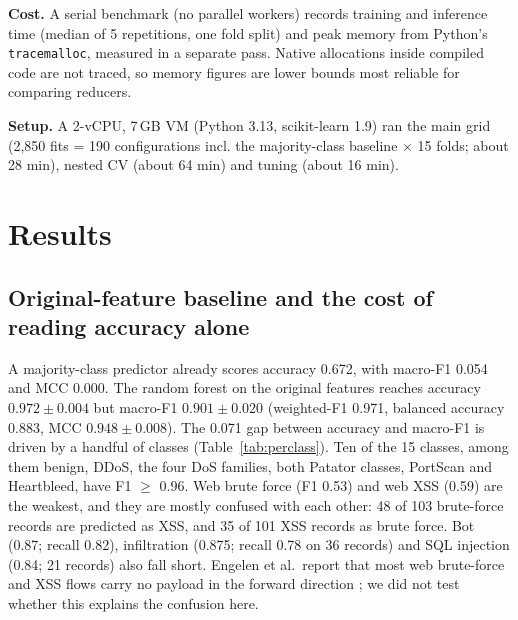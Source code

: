 \documentclass[runningheads]{llncs}
\begin{document}
\textbf{Cost.} A serial benchmark (no parallel workers) records training and inference time (median of 5 repetitions, one fold split) and peak memory from Python's \texttt{tracemalloc}, measured in a separate pass. Native allocations inside compiled code are not traced, so memory figures are lower bounds most reliable for comparing reducers.

\textbf{Setup.} A 2-vCPU, 7\,GB VM (Python 3.13, scikit-learn 1.9) ran the main grid (2{,}850 fits = 190 configurations incl. the majority-class baseline $\times$ 15 folds; about 28 min), nested CV (about 64 min) and tuning (about 16 min).

\section{Results}
\subsection{Original-feature baseline and the cost of reading accuracy alone}
A majority-class predictor already scores accuracy 0.672, with macro-F1 0.054 and MCC 0.000. The random forest on the original features reaches accuracy $0.972\pm0.004$ but macro-F1 $0.901\pm0.020$ (weighted-F1 0.971, balanced accuracy 0.883, MCC $0.948\pm0.008$). The 0.071 gap between accuracy and macro-F1 is driven by a handful of classes (Table~\ref{tab:perclass}). Ten of the 15 classes, among them benign, DDoS, the four DoS families, both Patator classes, PortScan and Heartbleed, have F1 $\ge$ 0.96. Web brute force (F1 0.53) and web XSS (0.59) are the weakest, and they are mostly confused with each other: 48 of 103 brute-force records are predicted as XSS, and 35 of 101 XSS records as brute force. Bot (0.87; recall 0.82), infiltration (0.875; recall 0.78 on 36 records) and SQL injection (0.84; 21 records) also fall short. Engelen et al.\ report that most web brute-force and XSS flows carry no payload in the forward direction \cite{engelen2021}; we did not test whether this explains the confusion here.

\begin{table}[htbp]
\caption{Per-class results of the selected model (RF, original features), pooled out-of-fold predictions, first repeat.}\label{tab:perclass}
\centering\scriptsize

\end{table}
\end{document}
